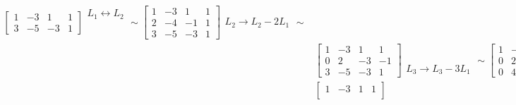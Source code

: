 \begin{exemplos}
\begin{enumerate}[label={\arabic*})]
\begin{solucao}
\begin{align*}
\begin{bmatrix}
                1 & -3 & 1 & 1\\
                3 & -5 & -3 & 1
                    \end{bmatrix}
                    \begin{array}{l}
                        L_1 \leftrightarrow L_2\\\phantom{x} \\\phantom{x} 
                    \end{array} \sim
                    \begin{bmatrix}
                1 & -3 & 1 & 1\\
                        2 & -4 & -1 & 1\\
                3 & -5 & -3 & 1
                    \end{bmatrix}
                    \begin{array}{l}
                        \phantom{x}\\  L_2 \to L_2 - 2L_1\\\phantom{x}
                    \end{array} \sim\\
                    &\begin{bmatrix}
                1 & -3 & 1 & 1\\
                        0 & 2 & -3 & -1\\
                3 & -5 & -3 & 1
                    \end{bmatrix}
                    \begin{array}{l}
                        \phantom{x}\\ \phantom{x}\\ L_3 \to L_3 - 3L_1
                    \end{array} \sim
                    \begin{bmatrix}
                1 & -3 & 1 & 1\\
                        0 & 2 & -3 & -1\\
                0 & 4 & -6 & -2
                    \end{bmatrix}
                    \begin{array}{l}
                        \phantom{x}\\ \phantom{x}\\ L_3 \to L_3 - 2L_1
                    \end{array} \sim\\
                    &\begin{bmatrix}
                1 & -3 & 1 & 1\\

\end{bmatrix}
\end{align*}
\end{solucao}
\end{enumerate}
\end{exemplos}

